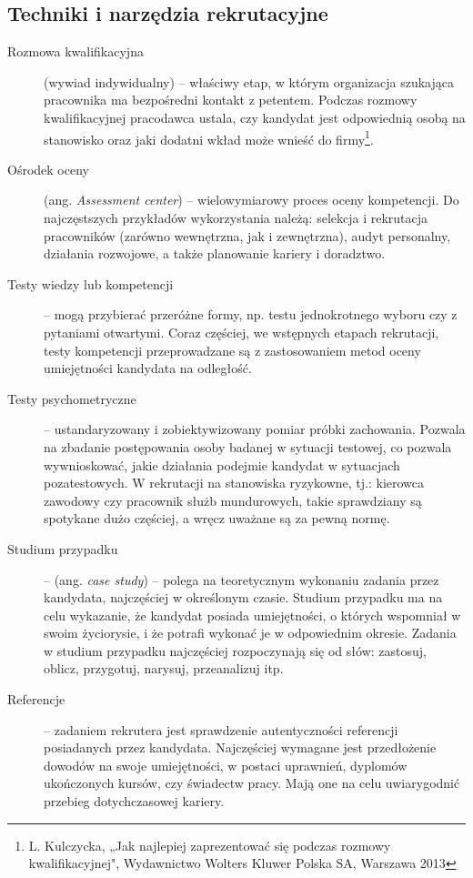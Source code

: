 \documentclass[twoside]{projektInzynierskiMS}
\numberwithin{figure}{section}
\begin{document}
\subsection{Techniki i narzędzia rekrutacyjne}
\begin{description}
\item[Rozmowa kwalifikacyjna] (wywiad indywidualny) – właściwy etap, w którym organizacja szukająca pracownika ma bezpośredni kontakt z petentem. Podczas rozmowy kwalifikacyjnej pracodawca ustala, czy kandydat jest odpowiednią osobą na stanowisko oraz jaki dodatni wkład może wnieść do firmy\footnote{L. Kulczycka, „Jak najlepiej zaprezentować się podczas rozmowy kwalifikacyjnej", Wydawnictwo Wolters Kluwer Polska SA, Warszawa 2013}.
\item[Ośrodek oceny] (ang. \textit{Assessment center}) – wielowymiarowy proces oceny kompetencji. Do najczęstszych przykładów wykorzystania należą: selekcja i rekrutacja pracowników (zarówno wewnętrzna, jak i zewnętrzna), audyt personalny, działania rozwojowe, a także planowanie kariery i doradztwo.
\item[Testy wiedzy lub kompetencji] – mogą przybierać przeróżne formy, np. testu jednokrotnego wyboru czy z pytaniami otwartymi. Coraz częściej, we wstępnych etapach rekrutacji, testy kompetencji przeprowadzane są z zastosowaniem metod oceny umiejętności kandydata na odległość.
\item[Testy psychometryczne] – ustandaryzowany i zobiektywizowany pomiar próbki zachowania. Pozwala na zbadanie postępowania osoby badanej w sytuacji testowej, co pozwala wywnioskować, jakie działania podejmie kandydat w sytuacjach pozatestowych. W rekrutacji na stanowiska ryzykowne, tj.: kierowca zawodowy czy pracownik służb mundurowych, takie sprawdziany są spotykane dużo częściej, a wręcz uważane są za pewną normę.
\item[Studium przypadku] – (ang. \textit{case study}) – polega na teoretycznym wykonaniu zadania przez kandydata, najczęściej w określonym czasie. Studium przypadku ma na celu wykazanie, że kandydat posiada umiejętności, o których wspomniał w swoim życiorysie, i że potrafi wykonać je w odpowiednim okresie. Zadania w studium przypadku najczęściej rozpoczynają się od słów: zastosuj, oblicz, przygotuj, narysuj, przeanalizuj itp.
\item[Referencje] – zadaniem rekrutera jest sprawdzenie autentyczności referencji posiadanych przez kandydata. Najczęściej wymagane jest przedłożenie dowodów na swoje umiejętności, w postaci uprawnień, dyplomów ukończonych kursów, czy świadectw pracy. Mają one na celu uwiarygodnić przebieg dotychczasowej kariery.

\end{description}
\end{document}
